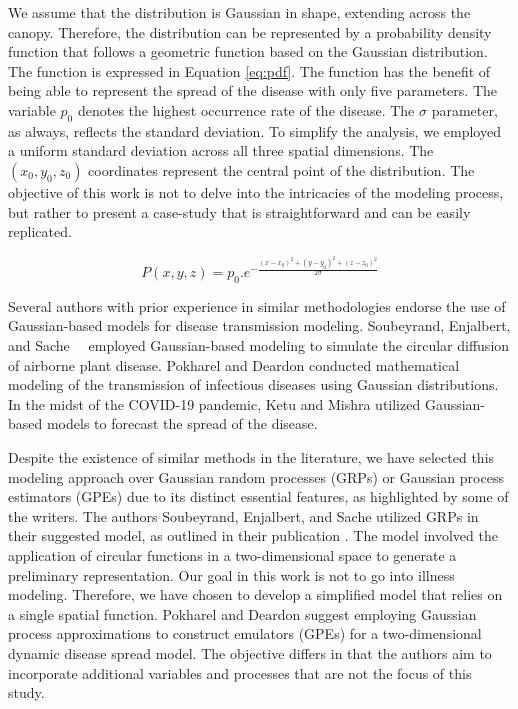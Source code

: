 We assume that the distribution is Gaussian in shape, extending across the canopy. Therefore, the distribution can be represented by a probability density function that follows a geometric function based on the Gaussian distribution. The function is expressed in Equation \ref{eq:pdf}. The function has the benefit of being able to represent the spread of the disease with only five parameters. The variable $p_0$ denotes the highest occurrence rate of the disease. The $\sigma$ parameter, as always, reflects the standard deviation. To simplify the analysis, we employed a uniform standard deviation across all three spatial dimensions. The $(x_0, y_0, z_0)$ coordinates represent the central point of the distribution. The objective of this work is not to delve into the intricacies of the modeling process, but rather to present a case-study that is straightforward and can be easily replicated.

\begin{equation}
\label{eq:pdf}
    P(x,y,z) = p_0 . e^{-\frac{(x-x_0)^2 + (y-y_0)^2 + (z-z_0)^2 }{2\sigma}}
\end{equation}

Several authors with prior experience in similar methodologies endorse the use of Gaussian-based models for disease transmission modeling. Soubeyrand, Enjalbert, and Sache \cite{soubeyrand2008accounting}  employed Gaussian-based modeling to simulate the circular diffusion of airborne plant disease. Pokharel and Deardon \cite{pokharel2016gaussian} conducted mathematical modeling of the transmission of infectious diseases using Gaussian distributions. In the midst of the COVID-19 pandemic, Ketu and Mishra \cite{ketu2021enhanced} utilized Gaussian-based models to forecast the spread of the disease.

Despite the existence of similar methods in the literature, we have selected this modeling approach over Gaussian random processes (GRPs) or Gaussian process estimators (GPEs) due to its distinct essential features, as highlighted by some of the writers. The authors Soubeyrand, Enjalbert, and Sache utilized GRPs in their suggested model, as outlined in their publication \cite{soubeyrand2008accounting}. The model involved the application of circular functions in a two-dimensional space to generate a preliminary representation. Our goal in this work is not to go into illness modeling. Therefore, we have chosen to develop a simplified model that relies on a single spatial function. Pokharel and Deardon \cite{pokharel2016gaussian} suggest employing Gaussian process approximations to construct emulators (GPEs) for a two-dimensional dynamic disease spread model. The objective differs in that the authors aim to incorporate additional variables and processes that are not the focus of this study.

